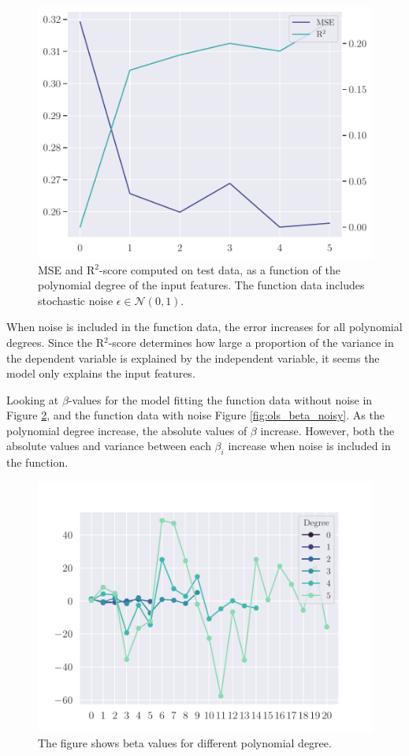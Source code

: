 \begin{figure}
    \centering
    \includegraphics[width=0.9\linewidth]{project-1/latex/figures/ols_error_noisy.pdf}
    \caption{MSE and R$^{2}$-score computed on test data, as a function of the polynomial degree of the input features. The function data includes stochastic noise $\epsilon \in \mathcal{N}(0, 1)$.}
    \label{fig:ols_error_noisy}
\end{figure}

When noise is included in the function data, the error increases for all polynomial degrees. Since the R$^{2}$-score determines how large a proportion of the variance in the dependent variable is explained by the independent variable, it seems the model only explains the input features.

Looking at $\beta$-values for the model fitting the function data without noise in Figure \ref{fig:ols_beta}, and the function data with noise Figure \ref{fig:ols_beta_noisy}. As the polynomial degree increase, the absolute values of $\beta$ increase. However, both the absolute values and variance between each $\beta_{i}$ increase when noise is included in the function.  
\begin{figure}
    \centering
    \includegraphics[width=0.9\linewidth]{project-1/latex/figures/ols_beta.pdf}
    \caption{The figure shows beta values for different polynomial degree.}
    \label{fig:ols_beta}
\end{figure}

